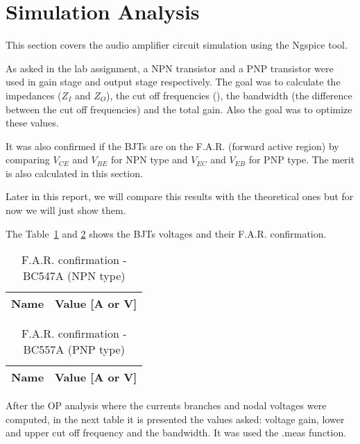 \section{Simulation Analysis}
\label{sec:simulation}

\hspace{0,5cm} This section covers the audio amplifier circuit simulation using the Ngspice tool.
\par As asked in the lab assignment, a NPN transistor and a PNP transistor were used in gain stage and output stage respectively. The goal was to calculate the impedances ($Z_I$ and $Z_O$), the cut off frequencies (), the bandwidth (the difference between the cut off frequencies) and the total gain. Also the goal was to optimize these values.
\par It was also confirmed if the BJTs are on the F.A.R. (forward active region) by comparing $V_{CE}$ and $V_{BE}$ for NPN type and $V_{EC}$ and $V_{EB}$ for PNP type. The merit is also calculated in this section.
\par Later in this report, we will compare this results with the theoretical ones but for now we will just show them.

\par The Table~\ref{tab:ng2} and \ref{tab:ng3} shows the BJTs voltages and their F.A.R. confirmation.

\begin{table}[!ht]
  \centering
  \begin{tabular}{|l|r|}
    \hline    
    {\bf Name} & {\bf Value [A or V]} \\ \hline
    
  \end{tabular}
  \caption{F.A.R. confirmation - BC547A (NPN type)}
  \label{tab:ng2}
\end{table}

\begin{table}[!ht]
  \centering
  \begin{tabular}{|l|r|}
    \hline    
    {\bf Name} & {\bf Value [A or V]} \\ \hline
    
  \end{tabular}
  \caption{F.A.R. confirmation - BC557A (PNP type)}
  \label{tab:ng3}
\end{table}

\par After the OP analysis where the currents branches and nodal voltages were computed, in the next table it is presented the values asked: voltage gain, lower and upper cut off frequency and the bandwidth. It was used the .meas function.

